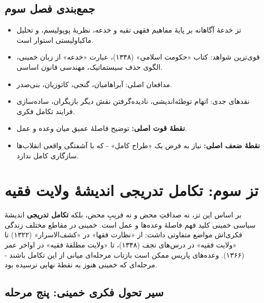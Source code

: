 \documentclass[12pt,a4paper]{book}
\newcommand{\keyword}[1]{\textbf{\textcolor{cPrimary}{#1}}}
\begin{document}
\section{جمع‌بندی فصل سوم}

\begin{principleBox}
\begin{itemize}[label=\textcolor{cPrimary}{$\blacksquare$}, rightmargin=2em]
    \item تز خدعهٔ آگاهانه بر پایهٔ مفاهیم فقهی تقیه و خدعه، نظریهٔ پوپولیسم، و تحلیل ماکیاولیستی استوار است.
    \item قوی‌ترین شواهد: کتاب «حکومت اسلامی» (۱۳۴۸)، عبارت «خدعه» از زبان خمینی، الگوی حذف سیستماتیک، مهندسی قانون اساسی.
    \item مدافعان اصلی: آبراهامیان، گنجی، کاتوزیان، بنی‌صدر.
    \item نقدهای جدی: اتهام توطئه‌اندیشی، نادیده‌گرفتن نقش دیگر بازیگران، ساده‌سازی فرایند تکامل فکری.
    \item \keyword{نقطهٔ قوت اصلی:} توضیح فاصلهٔ عمیق میان وعده و عمل.
    \item \keyword{نقطهٔ ضعف اصلی:} نیاز به فرض یک «طراح کامل» - که با آشفتگی واقعی انقلاب‌ها سازگاری کامل ندارد.
\end{itemize}
\end{principleBox}


\chapter{تز سوم: تکامل تدریجی اندیشهٔ ولایت فقیه}
\label{chap:e15986}


\begin{infoBox}
بر اساس این تز، نه صداقتِ محض و نه فریبِ محض، بلکه \keyword{تکامل تدریجی} اندیشهٔ سیاسی خمینی کلید فهم فاصلهٔ وعده‌ها و عمل است. خمینی در مقاطع مختلف زندگی فکری‌اش مواضع متفاوتی داشت: از «نظارت فقها» در «کشف‌الاسرار» (۱۳۲۲) تا «ولایت فقیه» در درس‌های نجف (۱۳۴۸)، تا «ولایت مطلقهٔ فقیه» در اواخر عمر (۱۳۶۶). وعده‌های پاریس ممکن است بازتاب مرحله‌ای میانی از این تکامل باشند - مرحله‌ای که خمینی هنوز به نقطهٔ نهایی نرسیده بود.
\end{infoBox}

\section{سیر تحول فکری خمینی: پنج مرحله}
\end{document}
